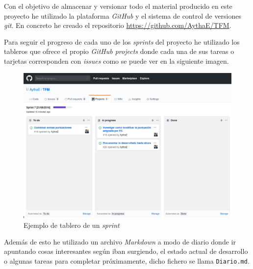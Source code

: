 Con el objetivo de almacenar y versionar todo el material producido en este proyecto he utilizado la plataforma \textit{GitHub} y el sistema de control de versiones \textit{git}. En concreto he creado el repositorio \url{https://github.com/AythaE/TFM}.

Para seguir el progreso de cada uno de los \textit{sprints} del proyecto he utilizado los tableros que ofrece el propio \textit{GitHub projects} donde cada una de sus tareas o tarjetas corresponden con \textit{issues} como se puede ver en la siguiente imagen. 

\begin{figure}[h]
	
	\centering
	\includegraphics[width=\linewidth]{imagenes/ejemplo_tablero_sprint}
	\caption{Ejemplo de tablero de un \textit{sprint}}
	\label{fig:tableroSprint}
\end{figure}

Además de esto he utilizado un archivo \textit{Markdown} a modo de diario donde ir apuntando cosas interesantes según iban surgiendo, el estado actual de desarrollo o algunas tareas para completar próximamente, dicho fichero se llama \texttt{Diario.md}.
